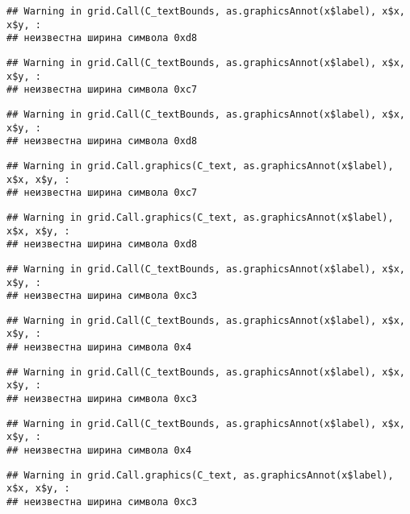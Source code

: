 \documentclass[
]{article}
\begin{document}
\begin{verbatim}
## Warning in grid.Call(C_textBounds, as.graphicsAnnot(x$label), x$x, x$y, :
## неизвестна ширина символа 0xd8
\end{verbatim}

\begin{verbatim}
## Warning in grid.Call(C_textBounds, as.graphicsAnnot(x$label), x$x, x$y, :
## неизвестна ширина символа 0xc7
\end{verbatim}

\begin{verbatim}
## Warning in grid.Call(C_textBounds, as.graphicsAnnot(x$label), x$x, x$y, :
## неизвестна ширина символа 0xd8
\end{verbatim}

\begin{verbatim}
## Warning in grid.Call.graphics(C_text, as.graphicsAnnot(x$label), x$x, x$y, :
## неизвестна ширина символа 0xc7
\end{verbatim}

\begin{verbatim}
## Warning in grid.Call.graphics(C_text, as.graphicsAnnot(x$label), x$x, x$y, :
## неизвестна ширина символа 0xd8
\end{verbatim}

\begin{verbatim}
## Warning in grid.Call(C_textBounds, as.graphicsAnnot(x$label), x$x, x$y, :
## неизвестна ширина символа 0xc3
\end{verbatim}

\begin{verbatim}
## Warning in grid.Call(C_textBounds, as.graphicsAnnot(x$label), x$x, x$y, :
## неизвестна ширина символа 0x4
\end{verbatim}

\begin{verbatim}
## Warning in grid.Call(C_textBounds, as.graphicsAnnot(x$label), x$x, x$y, :
## неизвестна ширина символа 0xc3
\end{verbatim}

\begin{verbatim}
## Warning in grid.Call(C_textBounds, as.graphicsAnnot(x$label), x$x, x$y, :
## неизвестна ширина символа 0x4
\end{verbatim}

\begin{verbatim}
## Warning in grid.Call.graphics(C_text, as.graphicsAnnot(x$label), x$x, x$y, :
## неизвестна ширина символа 0xc3
\end{verbatim}
\end{document}
